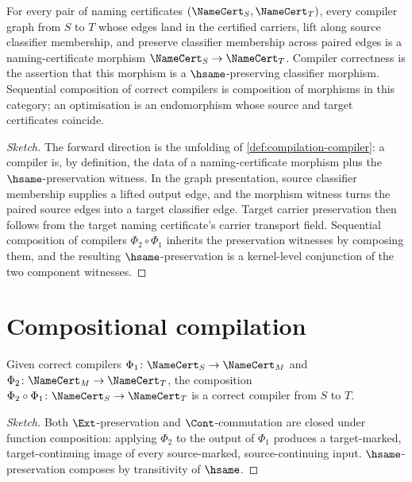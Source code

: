 \begin{theorem}
\label{thm:compilation-as-namecert-morphism}
For every pair of naming certificates $(\NameCert_{S}, \NameCert_{T})$, every compiler graph from $S$ to $T$ whose edges land in the certified carriers, lift along source classifier membership, and preserve classifier membership across paired edges is a naming-certificate morphism $\NameCert_{S} \to \NameCert_{T}$. Compiler correctness is the assertion that this morphism is a $\hsame$-preserving classifier morphism. Sequential composition of correct compilers is composition of morphisms in this category; an optimisation is an endomorphism whose source and target certificates coincide.
\end{theorem}

\begin{proof}[Sketch]
The forward direction is the unfolding of \autoref{def:compilation-compiler}: a compiler is, by definition, the data of a naming-certificate morphism plus the $\hsame$-preservation witness. In the graph presentation, source classifier membership supplies a lifted output edge, and the morphism witness turns the paired source edges into a target classifier edge. Target carrier preservation then follows from the target naming certificate's carrier transport field. Sequential composition of compilers $\Phi_2 \circ \Phi_1$ inherits the preservation witnesses by composing them, and the resulting $\hsame$-preservation is a kernel-level conjunction of the two component witnesses.
\end{proof}

\section{Compositional compilation}
\label{sec:compilation-compositional}

\begin{theorem}
\label{thm:compilation-composition-correct}
Given correct compilers $\Phi_1 \colon \NameCert_S \to \NameCert_M$ and $\Phi_2 \colon \NameCert_M \to \NameCert_T$, the composition $\Phi_2 \circ \Phi_1 \colon \NameCert_S \to \NameCert_T$ is a correct compiler from $S$ to $T$.
\end{theorem}

\begin{proof}[Sketch]
Both $\Ext$-preservation and $\Cont$-commutation are closed under function composition: applying $\Phi_2$ to the output of $\Phi_1$ produces a target-marked, target-continuing image of every source-marked, source-continuing input. $\hsame$-preservation composes by transitivity of $\hsame$.
\end{proof}

